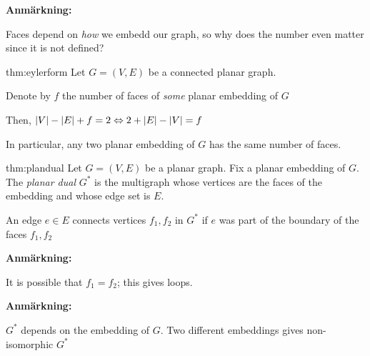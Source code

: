 \noindent\textbf{Anmärkning:}\par
\noindent Faces depend on \textit{how} we embedd our graph, so why does the number even matter since it is not defined?
\par\bigskip
\begin{theo}{thm:eylerform}
  Let $G = (V,E)$ be a connected planar graph.\par
  \noindent Denote by $f$ the number of faces of \textit{some} planar embedding of $G$
  \par\bigskip
  \noindent Then,  $\left|V\right|-\left|E\right|+f = 2\Leftrightarrow 2+\left|E\right|-\left|V\right| = f$
  \par\bigskip
  \noindent In particular, any two planar embedding of $G$ has the same number of faces. 
\end{theo}
\par\bigskip
\par\bigskip
\begin{theo}{thm:plandual}
  Let $G = (V,E)$ be a planar graph. Fix a planar embedding of $G$. The \textit{planar dual} $G^*$ is the multigraph whose vertices are the faces of the embedding and whose edge set is $E$.
  \par\bigskip
  \noindent An edge $e\in E$ connects vertices $f_1,f_2$ in $G^*$ if $e$ was part of the boundary of the faces $f_1,f_2$
  \par\bigskip
\end{theo}
\par\bigskip
\noindent\textbf{Anmärkning:}\par
\noindent It is possible that $f_1 = f_2$; this gives loops.
\par\bigskip
\noindent\textbf{Anmärkning:}\par
\noindent $G^*$ depends on the embedding of $G$. Two different embeddings gives non-isomorphic $G^*$
\par\bigskip
